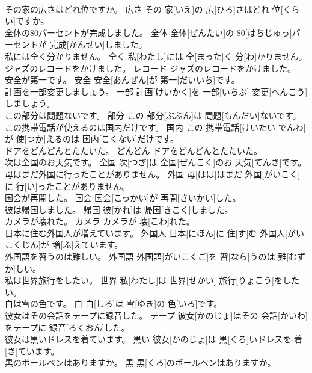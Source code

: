 \documentclass[8pt]{extreport}
\begin{document}
\begin{CJK}{UTF8}{min}
\\	その家の広さはどれ位ですか。	広さ	その 家[いえ]の 広[ひろ]さはどれ 位[くらい]ですか。	
\\	全体の80パーセントが完成しました。	全体	全体[ぜんたい]の 80[はちじゅっ]パーセントが 完成[かんせい]しました。	
\\	私には全く分かりません。	全く	私[わたし]には 全[まった]く 分[わ]かりません。	
\\	ジャズのレコードをかけました。	レコード	ジャズのレコードをかけました。	
\\	安全が第一です。	安全	安全[あんぜん]が 第一[だいいち]です。	
\\	計画を一部変更しましょう。	一部	計画[けいかく]を 一部[いちぶ] 変更[へんこう]しましょう。	
\\	この部分は問題ないです。	部分	この 部分[ぶぶん]は 問題[もんだい]ないです。	
\\	この携帯電話が使えるのは国内だけです。	国内	この 携帯電話[けいたい でんわ]が 使[つか]えるのは 国内[こくない]だけです。	
\\	ドアをどんどんとたたいた。	どんどん	ドアをどんどんとたたいた。	
\\	次は全国のお天気です。	全国	次[つぎ]は 全国[ぜんこく]のお 天気[てんき]です。	
\\	母はまだ外国に行ったことがありません。	外国	母[はは]はまだ 外国[がいこく]に 行[い]ったことがありません。	
\\	国会が再開した。	国会	国会[こっかい]が 再開[さいかい]した。	
\\	彼は帰国しました。	帰国	彼[かれ]は 帰国[きこく]しました。	
\\	カメラが壊れた。	カメラ	カメラが 壊[こわ]れた。	
\\	日本に住む外国人が増えています。	外国人	日本[にほん]に 住[す]む 外国人[がいこくじん]が 増[ふ]えています。	
\\	外国語を習うのは難しい。	外国語	外国語[がいこくご]を 習[なら]うのは 難[むずか]しい。	
\\	私は世界旅行をしたい。	世界	私[わたし]は 世界[せかい] 旅行[りょこう]をしたい。	
\\	白は雪の色です。	白	白[しろ]は 雪[ゆき]の 色[いろ]です。	
\\	彼女はその会話をテープに録音した。	テープ	彼女[かのじょ]はその 会話[かいわ]をテープに 録音[ろくおん]した。	
\\	彼女は黒いドレスを着ています。	黒い	彼女[かのじょ]は 黒[くろ]いドレスを 着[き]ています。	
\\	黒のボールペンはありますか。	黒	黒[くろ]のボールペンはありますか。	

\end{CJK}
\end{document}
